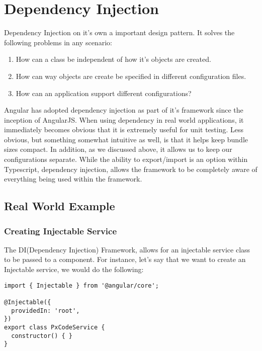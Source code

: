 \section{ Dependency Injection }
\maketitle{}

Dependency Injection on it's own a important design pattern. It solves the
following problems in any scenario:
\begin{enumerate}
  \item How can a class be independent of how it's objects are created.
  \item How can way objects are create be specified in different configuration
  files.
  \item How can an application support different configurations?
\end{enumerate}

Angular has adopted dependency injection as part of it's framework since the
inception of AngularJS. When using dependency in real world applications, it
immediately becomes obvious that it is extremely useful for unit testing. Less obvious, but something somewhat intuitive as well, is that it helps keep bundle
sizes compact. In addition, as we discussed above, it allows us to keep our
configurations separate. While the ability to export/import is an option within
Typescript, dependency injection, allows the framework to be completely aware
of everything being used within the framework.

\subsection{ Real World Example }

\subsubsection{ Creating Injectable Service }
The DI(Dependency Injection) Framework, allows for an injectable service class
to be passed to a component. For instance, let's say that we want to create an
Injectable service, we would do the following:
\begin{lstlisting}
import { Injectable } from '@angular/core';

@Injectable({
  providedIn: 'root',
})
export class PxCodeService {
  constructor() { }
}
\end{lstlisting}

